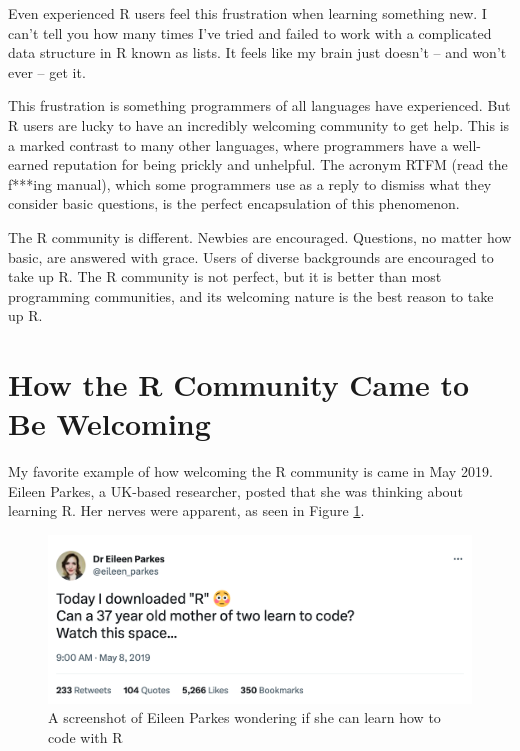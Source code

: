 \documentclass[
]{book}
\begin{document}
Even experienced R users feel this frustration when learning something new. I can't tell you how many times I've tried and failed to work with a complicated data structure in R known as lists. It feels like my brain just doesn't -- and won't ever -- get it.

This frustration is something programmers of all languages have experienced. But R users are lucky to have an incredibly welcoming community to get help. This is a marked contrast to many other languages, where programmers have a well-earned reputation for being prickly and unhelpful. The acronym RTFM (read the f***ing manual), which some programmers use as a reply to dismiss what they consider basic questions, is the perfect encapsulation of this phenomenon.

The R community is different. Newbies are encouraged. Questions, no matter how basic, are answered with grace. Users of diverse backgrounds are encouraged to take up R. The R community is not perfect, but it is better than most programming communities, and its welcoming nature is the best reason to take up R.

\hypertarget{how-the-r-community-came-to-be-welcoming}{%
\section*{How the R Community Came to Be Welcoming}\label{how-the-r-community-came-to-be-welcoming}}

My favorite example of how welcoming the R community is came in May 2019. Eileen Parkes, a UK-based researcher, posted that she was thinking about learning R. Her nerves were apparent, as seen in Figure \ref{fig:eileen-parkes-tweet}.

\begin{figure}
\includegraphics[width=1\linewidth]{assets/eileen-parkes-tweet} \caption{A screenshot of Eileen Parkes wondering if she can learn how to code with R}\label{fig:eileen-parkes-tweet}
\end{figure}
\end{document}

